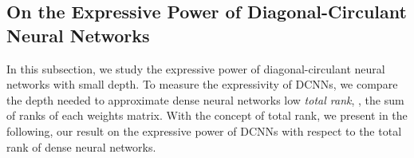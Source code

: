 




\subsection{On the Expressive Power of Diagonal-Circulant Neural Networks}
\label{subsection:ch4-on_the_expressive_power_of_diagonal-circulant_neural_networks}




In this subsection, we study the expressive power of diagonal-circulant neural networks with small depth.
To measure the expressivity of DCNNs, we compare the depth needed to approximate dense neural networks low \emph{total rank}, \ie, the sum of ranks of each weights matrix.
With the concept of total rank, we present in the following,  our result on the expressive power of DCNNs with respect to the total rank of dense neural networks.




